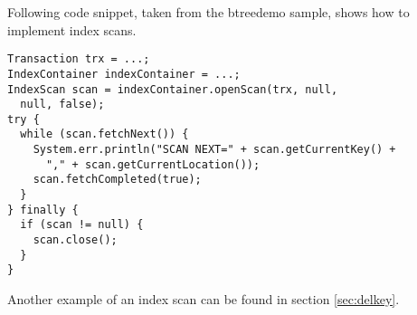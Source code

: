 \documentclass[a4paper,draft,oneside]{book}
\begin{document}
Following code snippet, taken from the btreedemo sample,
shows how to implement index scans.

\begin{verbatim}
Transaction trx = ...;
IndexContainer indexContainer = ...;
IndexScan scan = indexContainer.openScan(trx, null, 
  null, false);
try {
  while (scan.fetchNext()) {
    System.err.println("SCAN NEXT=" + scan.getCurrentKey() + 
      "," + scan.getCurrentLocation());
    scan.fetchCompleted(true);
  }
} finally {
  if (scan != null) {
    scan.close();
  }
}
\end{verbatim}

Another example of an index scan can be found in section \ref{sec:delkey}.
\end{document}
